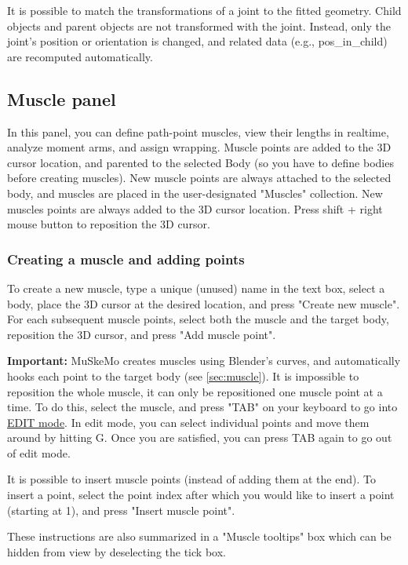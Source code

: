 \documentclass{article}
\begin{document}
It is possible to match the transformations of a joint to the fitted geometry. Child objects and parent objects are not transformed with the joint. Instead, only the joint's position or orientation is changed, and related data (e.g., pos\_in\_child) are recomputed automatically.

\subsection{Muscle panel}

In this panel, you can define path-point muscles, view their lengths in realtime, analyze moment arms, and assign wrapping. Muscle points are added to the 3D cursor location, and parented to the selected Body (so you have to define bodies before creating muscles). New muscle points are always attached to the selected body, and muscles are placed in the user-designated "Muscles" collection. New muscles points are always added to the 3D cursor location. Press shift + right mouse button to reposition the 3D cursor. 

\subsubsection{Creating a muscle and adding points}

To create a new muscle, type a unique (unused) name in the text box, select a body, place the 3D cursor at the desired location, and press "Create new muscle". For each subsequent muscle points, select both the muscle and the target body, reposition the 3D cursor, and press "Add muscle point".

\textbf{Important:} MuSkeMo creates muscles using Blender's curves, and automatically hooks each point to the target body (see \ref{sec:muscle}). It is impossible to reposition the whole muscle, it can only be repositioned one muscle point at a time. To do this, select the muscle, and press "TAB" on your keyboard to go into \href{https://docs.blender.org/manual/en/latest/editors/3dview/modes.html}{EDIT mode}. In edit mode, you can select individual points and move them around by hitting G. Once you are satisfied, you can press TAB again to go out of edit mode.

It is possible to insert muscle points (instead of adding them at the end). To insert a point, select the point index after which you would like to insert a point (starting at 1), and press "Insert muscle point".

These instructions are also summarized in a "Muscle tooltips" box which can be hidden from view by deselecting the tick box.
\end{document}
